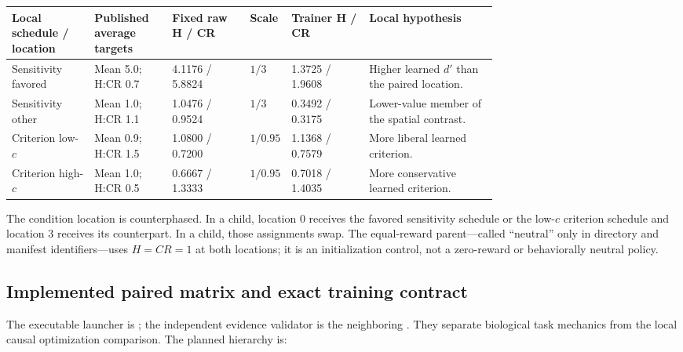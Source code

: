 \documentclass[10pt]{article}
\newcommand{\code}[1]{\texttt{\detokenize{#1}}}
\begin{document}
\small
\begin{tabularx}{\linewidth}{@{}p{0.17\linewidth}p{0.16\linewidth}p{0.16\linewidth}p{0.07\linewidth}p{0.16\linewidth}Y@{}}
\toprule
Local schedule / location & Published average targets & Fixed raw H / CR & Scale & Trainer H / CR & Local hypothesis \\
\midrule
Sensitivity favored & Mean 5.0; H:CR 0.7 & 4.1176 / 5.8824 & $1/3$ & 1.3725 / 1.9608 & Higher learned $d'$ than the paired location. \\
Sensitivity other & Mean 1.0; H:CR 1.1 & 1.0476 / 0.9524 & $1/3$ & 0.3492 / 0.3175 & Lower-value member of the spatial contrast. \\
Criterion low-$c$ & Mean 0.9; H:CR 1.5 & 1.0800 / 0.7200 & $1/0.95$ & 1.1368 / 0.7579 & More liberal learned criterion. \\
Criterion high-$c$ & Mean 1.0; H:CR 0.5 & 0.6667 / 1.3333 & $1/0.95$ & 0.7018 / 1.4035 & More conservative learned criterion. \\
\bottomrule
\end{tabularx}
\normalsize

The condition location is counterphased. In a \code{condition_loc=0} child, location 0 receives the favored sensitivity schedule or the low-$c$ criterion schedule and location 3 receives its counterpart. In a \code{condition_loc=3} child, those assignments swap. The equal-reward parent---called ``neutral'' only in directory and manifest identifiers---uses $H=CR=1$ at both locations; it is an initialization control, not a zero-reward or behaviorally neutral policy.

\subsection{Implemented paired matrix and exact training contract}

The executable launcher is ; the independent evidence validator is the neighboring . They separate biological task mechanics from the local causal optimization comparison. The planned hierarchy is:
\end{document}
